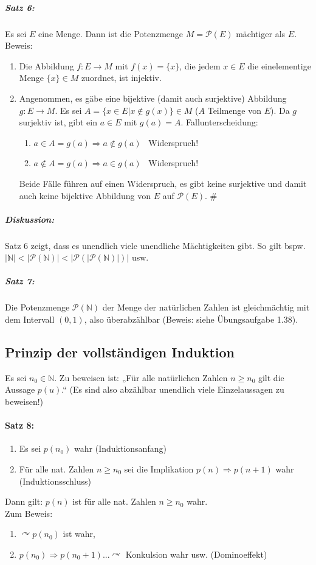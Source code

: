 \subparagraph{Satz 6:} \parskp
Es sei $E$ eine Menge. Dann ist die Potenzmenge $M=\mathcal{P}(E)$ mächtiger als $E$.\\
Beweis: 
\begin{enumerate}
\item Die Abbildung $f: E \rightarrow M$ mit $f(x)=\{x\}$, die jedem $x \in E$ die einelementige Menge $\{x\}\in M$ zuordnet, ist injektiv.
\item Angenommen, es gäbe eine bijektive (damit auch surjektive) Abbildung $g: E \rightarrow M$. Es sei $A = \{x \in E| x \not \in g (x)\}\in M$ ($A$ Teilmenge von $E$). Da $g$ surjektiv ist, gibt ein $a \in E$ mit $g(a)=A$. Fallunterscheidung:
\begin{enumerate} %
\item $a\in A= g(a) \Rightarrow a \not \in g(a)$ \lightning\, Widerspruch!
\item $a \not \in A =g(a) \Rightarrow a \in g(a)$ \lightning\, Widerspruch!
\end{enumerate}
Beide Fälle führen auf einen Widerspruch, es gibt keine surjektive und damit auch keine bijektive Abbildung von $E$ auf $\mathcal{P}(E)$. \#
\end{enumerate}

\subparagraph{Diskussion:}\parskp
Satz 6 zeigt, dass es unendlich viele unendliche Mächtigkeiten gibt. So gilt bspw. $|\mathbb{N}|<|\mathcal{P}(\mathbb{N})|<|\mathcal{P}(|\mathcal{P}(\mathbb{N})|)|$ usw. 

\subparagraph{Satz 7:} \parskp
Die Potenzmenge $\mathcal{P}(\mathbb{N})$ der Menge der natürlichen Zahlen ist gleichmächtig mit dem Intervall $(0,1)$, also überabzählbar (Beweis: siehe Übungsaufgabe 1.38).

\subsection{Prinzip der vollständigen Induktion}

Es sei $n_0 \in \mathbb{N}$. Zu beweisen ist: „Für alle natürlichen Zahlen $n\geq n_0$ gilt die Aussage $p(u)$.“ (Es sind also abzählbar unendlich viele Einzelaussagen zu beweisen!)

\paragraph{Satz 8:} 
\begin{enumerate}
\item Es sei $\boxed{p(n_0)}$ wahr (Induktionsanfang)
\item Für alle nat. Zahlen $n \geq n_0$ sei die Implikation $\boxed{p(n)\Rightarrow p(n+1)}$ wahr (Induktionsschluss)
\end{enumerate}
Dann gilt: $p(n)$ ist für alle nat. Zahlen $n\geq n_0$ wahr.\smallskip\\
Zum Beweis:
\begin{enumerate}
\item $\curvearrowright p(n_0)$ ist wahr, 
\item $p(n_0)\Rightarrow p(n_0+1) ... \curvearrowright$ Konkulsion wahr usw. (Dominoeffekt)
\end{enumerate}

